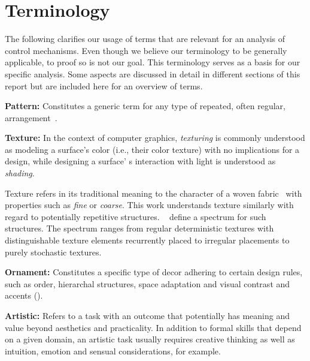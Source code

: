 
\section{Terminology}

The following clarifies our usage of terms that are relevant for an analysis of control mechanisms. Even though we believe our terminology to be generally applicable, to proof so is not our goal. This terminology serves as a basis for our specific analysis. Some aspects are discussed in detail in different sections of this report but are included here for an overview of terms.

\textbf{Pattern:} Constitutes a generic term for any type of repeated, often regular, arrangement~\cite{oed_2017}.

\textbf{Texture:} \label{par:taxo_terminology_texture}In the context of computer graphics, \textit{texturing} is commonly understood as modeling a surface's color (i.e., their color texture) with no implications for a design, while designing a surface' s interaction with light is understood as \textit{shading}. 

Texture refers in its traditional meaning to the character of a woven fabric~\cite{oed_2017} with properties such as \textit{fine} or \textit{coarse}. This work understands texture similarly with regard to potentially repetitive structures. \citeauthor*{lin_2006_qeo}~\cite{lin_2006_qeo} define a spectrum for such structures. The spectrum ranges from regular deterministic textures with distinguishable texture elements recurrently placed to irregular placements to purely stochastic textures.


\textbf{Ornament:} Constitutes a specific type of decor adhering to certain design rules, such as order, hierarchal structures, space adaptation and visual contrast and accents ().

\textbf{Artistic:} Refers to a task with an outcome that potentially has meaning and value beyond aesthetics and practicality. In addition to formal skills that depend on a given domain, an artistic task usually requires creative thinking as well as intuition, emotion and sensual considerations, for example.

